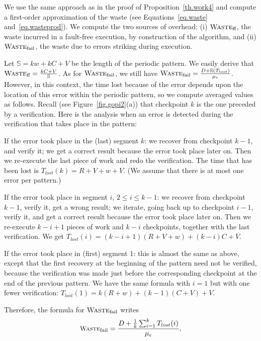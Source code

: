 \documentclass[10pt,table]{article}
\newcommand{\ema}[1]{\ensuremath{#1}\xspace}
\newcommand{\E}{\mathbb{E}}
\newcommand{\Xlost}{\ema{T_{lost}}}
\newcommand{\www}{\ema{w}}
\newcommand{\mue}{\ema{\mu_{e}}}
\newcommand{\ccc}{\ema{C}}
\newcommand{\rrr}{\ema{R}}
\newcommand{\ddd}{\ema{D}}
\newcommand{\vvv}{\ema{V}}
\newcommand{\sss}{\ema{\mathbb{S}}}
\newcommand{\Wasteff}{\ema{\textsc{Waste}_{\text{ff}}}}
\newcommand{\Wastefail}{\ema{\textsc{Waste}_{\text{fail}}}}
\begin{document}
We use the same approach as in the proof of Proposition~\ref{th.work4} and compute 
a first-order approximation of the waste (see Equations~\eqref{eq.waste} and~\eqref{eq.wasteprod}).
We compute the two
sources of overhead: (i) \Wasteff, the waste incurred in a fault-free
execution, by construction of the algorithm, and (ii)
\Wastefail, the waste due to errors striking during execution. 

Let $\sss= k\www + k\ccc + \vvv$ be the length of the periodic pattern.
We easily derive that $\Wasteff = \frac{k\ccc + \vvv}{\sss}$. As for \Wastefail, we still have
 $\Wastefail = \frac{\ddd+\E(\Xlost)}{\mue}$. However, in this context, the time lost because of the error depends upon 
the location of this error within the periodic pattern, so we compute averaged values as follows.
Recall (see Figure~\ref{fig.gopi2}(a)) that checkpoint $k$ is the one preceded by a verification. 
Here is the analysis when an error is detected during the verification that takes place in the pattern:
\begin{compactitem}
\item If the error took place in the (last) segment $k$: we recover from checkpoint $k-1$, 
and verify it; we get a correct result because the error took place
later on. Then we re-execute the last piece of work and redo the
verification. The time that has been lost is $\Xlost(k) = \rrr + \vvv
+ \www + \vvv$. (We assume that there is at most one error
per pattern.)
\item If the error took place in segment $i$, $2 \leq i \leq k-1$:  we recover from checkpoint $k-1$, 
verify it, get a wrong result; we iterate, going back up to checkpoint $i-1$, verify it, and get a correct result because the error took place later on. Then we re-execute $k-i+1$ pieces of work and $k-i$ checkpoints, together with the last verification. We get $\Xlost(i) = (k-i+1) (\rrr + \vvv + \www) + (k-i)\ccc + \vvv$.
\item If the error took place in (first) segment $1$: this is almost the same as above, except that the first recovery at the beginning of the pattern need not be verified, because the verification was made just before
the corresponding checkpoint at the end of the previous pattern. We have the same formula with $i=1$ but with one fewer verification:  $\Xlost(1) = k(\rrr + \www) + (k-1)(\ccc + \vvv) + \vvv$.
\end{compactitem}
Therefore, the formula for \Wastefail writes
\begin{equation}
\small
\Wastefail = \frac{\ddd+\frac{1}{k}\sum_{i=1}^{k} \Xlost(i)}{\mue} , 
\label{eq.waste-fail-kc1v}
\end{equation}
\end{document}

